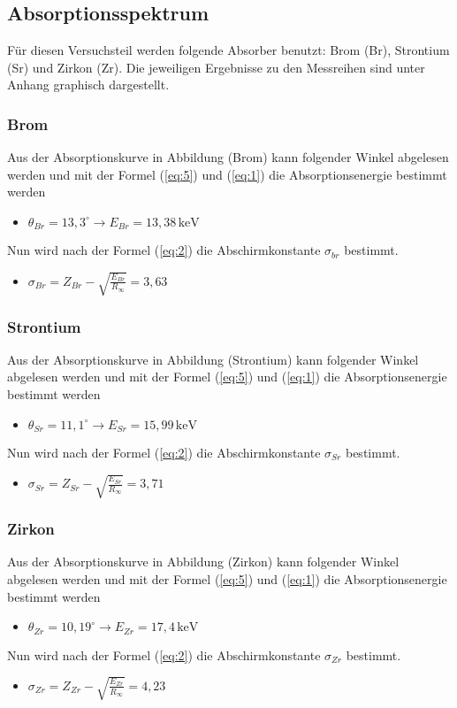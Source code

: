 \subsection{Absorptionsspektrum}
Für diesen Versuchsteil werden folgende Absorber benutzt: Brom (Br), Strontium (Sr) und Zirkon (Zr).
Die jeweiligen Ergebnisse zu den Messreihen sind unter Anhang graphisch dargestellt.
\subsubsection{Brom}
Aus der Absorptionskurve in Abbildung (Brom) kann folgender Winkel abgelesen werden und mit der Formel (\ref{eq:5}) und (\ref{eq:1}) die
Absorptionsenergie bestimmt werden
\begin{itemize}
  \item $\theta_{Br} = 13,3^\circ \rightarrow E_{Br} = 13,38 \, \text{keV}$
\end{itemize}
Nun wird nach der Formel (\ref{eq:2}) die Abschirmkonstante $\sigma_{br}$ bestimmt.
\begin{itemize}
  \item $\sigma_{Br} = Z_{Br} - \sqrt{\frac{E_{Br}}{R_\infty}} = 3,63$
\end{itemize}
\subsubsection{Strontium}
Aus der Absorptionskurve in Abbildung (Strontium) kann folgender Winkel abgelesen werden und mit der Formel (\ref{eq:5}) und (\ref{eq:1}) die
Absorptionsenergie bestimmt werden
\begin{itemize}
  \item $\theta_{Sr} = 11,1^\circ \rightarrow E_{Sr} = 15,99 \,\text{keV}$
\end{itemize}
Nun wird nach der Formel (\ref{eq:2}) die Abschirmkonstante $\sigma_{Sr}$ bestimmt.
\begin{itemize}
  \item $\sigma_{Sr} = Z_{Sr} - \sqrt{\frac{E_{Sr}}{R_\infty}} = 3,71$
\end{itemize}
\subsubsection{Zirkon}
Aus der Absorptionskurve in Abbildung (Zirkon) kann folgender Winkel abgelesen werden und mit der Formel (\ref{eq:5}) und (\ref{eq:1}) die
Absorptionsenergie bestimmt werden
\begin{itemize}
  \item $\theta_{Zr} = 10,19^\circ \rightarrow E_{Zr} = 17,4 \, \text{keV}$
\end{itemize}
Nun wird nach der Formel (\ref{eq:2}) die Abschirmkonstante $\sigma_{Zr}$ bestimmt.
\begin{itemize}
  \item $\sigma_{Zr} = Z_{Zr} - \sqrt{\frac{E_{Zr}}{R_\infty}} = 4,23$
\end{itemize}
